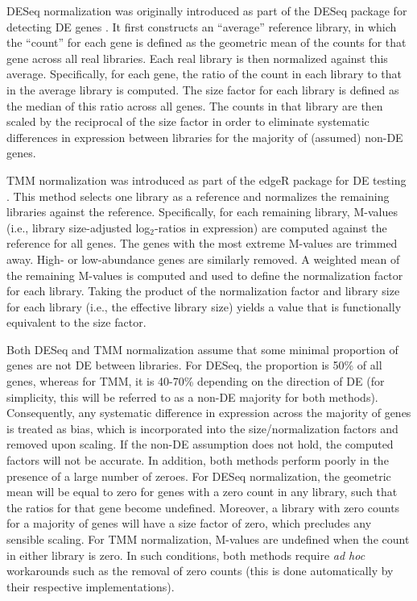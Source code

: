 \documentclass{bmcart}
\newcommand{\revised}[1]{#1}
\begin{document}
DESeq normalization was originally introduced as part of the DESeq package for detecting DE genes \cite{anders2010differential}.
It first constructs an ``average'' reference library, in which the ``count'' for each gene is defined as the geometric mean of the counts for that gene across all real libraries.
Each real library is then normalized against this average.
Specifically, for each gene, the ratio of the count in each library to that in the average library is computed.
The size factor for each library is defined as the median of this ratio across all genes.
The counts in that library are then scaled by the reciprocal of the size factor in order to eliminate systematic differences in expression between libraries for the majority of (assumed) non-DE genes.

TMM normalization was introduced as part of the edgeR package for DE testing \cite{robinson2010edgeR}.
This method selects one library as a reference and normalizes the remaining libraries against the reference.
Specifically, for each remaining library, M-values (i.e., library size-adjusted log$_2$-ratios in expression) are computed against the reference for all genes.
The genes with the most extreme M-values are trimmed away.
High- or low-abundance genes are similarly removed.
\revised{A} weighted mean of the remaining M-values is computed and used to define the normalization factor for each library.
Taking the product of the normalization factor and library size for each library (i.e., the effective library size) yields a value that is functionally equivalent to the size factor.

Both DESeq and TMM normalization assume that some minimal proportion of genes are not DE between libraries.
For DESeq, the proportion is 50\% of all genes, whereas for TMM, it is 40-70\% depending on the direction of DE \cite{robinson2010scaling} (for simplicity, this will be referred to as a non-DE majority for both methods).
Consequently, any systematic difference in expression across the majority of genes is treated as bias, which is incorporated into the size/normalization factors and removed upon scaling.
If the non-DE assumption does not hold, the computed factors will not be accurate.
In addition, both methods perform poorly in the presence of a large number of zeroes.
For DESeq normalization, the geometric mean will be equal to zero for genes with a zero count in any library, such that the ratios for that gene become undefined.
Moreover, a library with zero counts for a majority of genes will have a size factor of zero, which precludes any sensible scaling.
For TMM normalization, M-values are undefined when the count in either library is zero.
In such conditions, both methods require \textit{ad hoc} workarounds such as the removal of zero counts (this is done automatically by their respective implementations).
\end{document}

